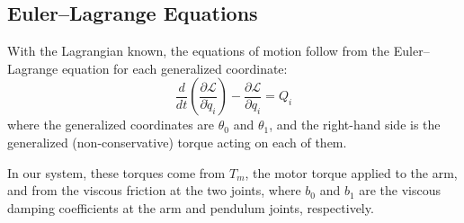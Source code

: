 \documentclass[a4paper,11pt]{article}
\begin{document}
\subsection{Euler--Lagrange Equations}
With the Lagrangian known, the equations of motion follow from the Euler--Lagrange equation for each generalized coordinate:
\begin{equation}
  \frac{d}{dt}\left(\frac{\partial \mathcal{L}}{\partial \dot q_i}\right) - \frac{\partial \mathcal{L}}{\partial q_i} = Q_i
\end{equation}
where the generalized coordinates are $\theta_0$ and $\theta_1$, and the right-hand side is the generalized (non-conservative) torque acting on each of them.

In our system, these torques come from $T_m$, the motor torque applied to the arm, and from the viscous friction at the two joints, where $b_0$ and $b_1$ are the viscous damping coefficients at the arm and pendulum joints, respectively.
\end{document}
